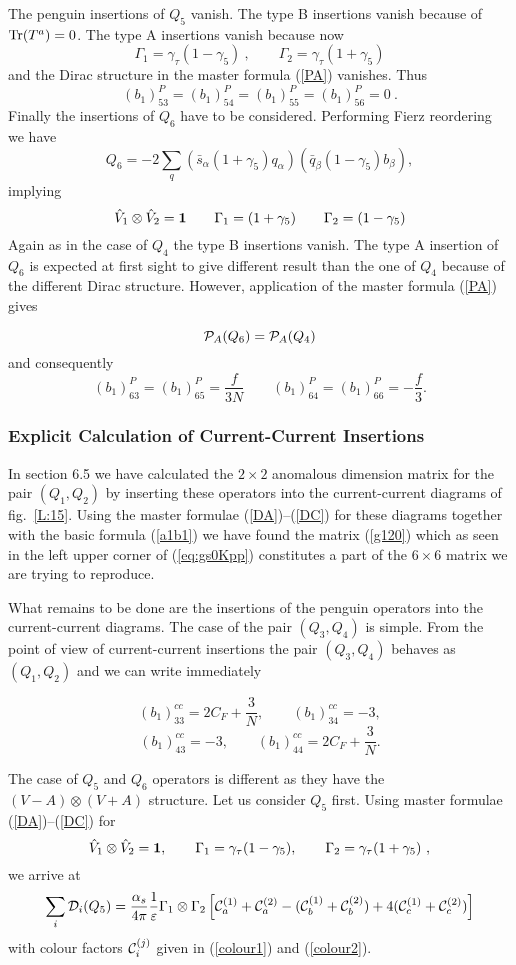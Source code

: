 \documentclass[12pt]{article}
\def\as{\alpha_s}
\newcommand{\be}{\begin{equation}}
\newcommand{\ee}{\end{equation}}
\begin{document}
\begin{itemize}
\begin{itemize}
The penguin insertions of $Q_5$ vanish. The type B insertions vanish because
of ${\rm Tr}(T^a)=0$. The type A insertions vanish because now
\be\label{DI5}
\Gamma_1=\gamma_\tau(1-\gamma_5)~, \quad\quad
\Gamma_2=\gamma_\tau(1+\gamma_5)
\ee
and the Dirac structure in the master formula (\ref{PA}) vanishes. Thus
\be\label{Q5ROW}
(b_1)_{53}^P=(b_1)_{54}^P=
(b_1)_{55}^P=(b_1)_{56}^P=0~.
\ee
Finally the insertions of $Q_6$ have to be considered. Performing
Fierz reordering we have
\be\label{FQ6}
Q_6=-2 \sum_q (\bar s_\alpha(1+\gamma_5) q_\alpha)
 (\bar q_\beta (1-\gamma_5) b_\beta),
\ee
implying
\be\label{DICO6}
\hat V_1\otimes \hat V_2={\bf 1} \quad\quad 
\Gamma_1=(1+\gamma_5) \quad\quad \Gamma_2=(1-\gamma_5)
\ee
Again as in the case of $Q_4$ the type B insertions vanish. The
type A insertion of $Q_6$ is expected at first sight to give different
result than the
one of $Q_4$ because of the different Dirac structure.
However, application of the master formula (\ref{PA}) gives

\be\label{PAQ6}
{\cal P}_A(Q_6)= {\cal P}_A(Q_4) 
\ee
and consequently
\be\label{Q6ROW}
(b_1)_{63}^P=(b_1)_{65}^P=\frac{f}{3N} \quad\quad
(b_1)_{64}^P=(b_1)_{66}^P=-\frac{f}{3}.
\ee
\subsubsection{Explicit Calculation of Current-Current Insertions}
In section 6.5 we have calculated the $2\times 2$ anomalous dimension
matrix for the pair $(Q_1,Q_2)$ by inserting these operators into
the current-current diagrams of fig.~\ref{L:15}. Using the master formulae
(\ref{DA})--(\ref{DC}) for these diagrams together with the basic formula
(\ref{a1b1}) we have found the matrix (\ref{g120}) 
which as seen  in the left
upper corner of (\ref{eq:gs0Kpp}) constitutes a  part of the 
$6\times 6$ matrix
we are trying to reproduce.

What remains to be done are the insertions of the penguin operators into
the current-current diagrams. The case of the pair $(Q_3,Q_4)$ is
simple. From the point of view of current-current insertions the
pair $(Q_3,Q_4)$ behaves as $(Q_1,Q_2)$ and we can write immediately

\be\label{Q3CROW}
(b_1)_{33}^{cc}=2 C_F+\frac{3}{N}, \quad\quad
(b_1)_{34}^{cc}=-3,
\ee
\be\label{Q4CROW}
(b_1)_{43}^{cc}=-3,\quad\quad
(b_1)_{44}^{cc}=2 C_F+\frac{3}{N}. 
\ee

The case of $Q_5$ and $Q_6$ operators is different as they have the
$(V-A)\otimes (V+A)$ structure. Let us consider $Q_5$ first.
Using master formulae (\ref{DA})--(\ref{DC}) for
\be\label{DICO5}
\hat V_1\otimes \hat V_2={\bf 1}, \quad\quad 
\Gamma_1=\gamma_\tau(1-\gamma_5), \quad\quad
\Gamma_2=\gamma_\tau(1+\gamma_5)~,
\ee
we arrive at
\be\label{Q5SUMD}
\sum_i {\cal D}_i(Q_5)=\frac{\as}{4\pi} \frac{1}{\varepsilon}
\Gamma_1\otimes\Gamma_2
\left[{\cal C}_a^{(1)}+{\cal C}_a^{(2)}-
 ({\cal C}_b^{(1)}+{\cal C}_b^{(2)})+
4({\cal C}_c^{(1)}+{\cal C}_c^{(2)})\right]
\ee
with colour factors ${\cal C}_i^{(j)}$ given in (\ref{colour1}) and
(\ref{colour2}).


\end{itemize}
\end{itemize}
\end{document}
